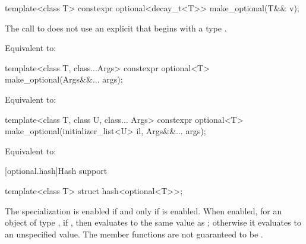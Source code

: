 %
\begin{itemdecl}
template<class T> constexpr optional<decay_t<T>> make_optional(T&& v);
\end{itemdecl}

\begin{itemdescr}
\pnum
\constraints
The call to  does not use
an explicit  that
begins with a type .

\pnum
\effects
Equivalent to: 
\end{itemdescr}

%
\begin{itemdecl}
template<class T, class...Args>
  constexpr optional<T> make_optional(Args&&... args);
\end{itemdecl}

\begin{itemdescr}
\pnum
\effects
Equivalent to: 
\end{itemdescr}

%
\begin{itemdecl}
template<class T, class U, class... Args>
  constexpr optional<T> make_optional(initializer_list<U> il, Args&&... args);
\end{itemdecl}

\begin{itemdescr}
\pnum
\effects
Equivalent to: 
\end{itemdescr}

[optional.hash]{Hash support}

%
\begin{itemdecl}
template<class T> struct hash<optional<T>>;
\end{itemdecl}

\begin{itemdescr}
\pnum
The specialization  is enabled
if and only if  is enabled.
When enabled, for an object  of type ,
if , then 
evaluates to the same value as ;
otherwise it evaluates to an unspecified value.
The member functions are not guaranteed to be .
\end{itemdescr}


